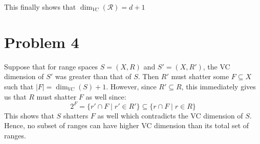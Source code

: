 \documentclass[12pt]{article}%
\begin{document}
\begin{enumerate}
  This finally shows that $\dim_{VC}(\mathcal{R}) = d+1$
\end{enumerate}

\section*{Problem 4}
Suppose that for range spaces $S = (X,R)$ and $S' = (X,R')$, the VC dimension of $S'$ was greater than that of $S$. Then $R'$ must shatter some $F \subseteq X$ such that $|F| = \dim_{VC}(S)+1$. However, since $R'\subseteq R$, this immediately gives us that $R$ must shatter $F$ as well since:
$$ 2^F = \{r' \cap F \mid r' \in R'\} \subseteq \{ r \cap F \mid r \in R\}$$
This shows that $S$ shatters $F$ as well which contradicts the VC dimension of $S$. Hence, no subset of ranges can have higher VC dimension than its total set of ranges.
\end{document}
